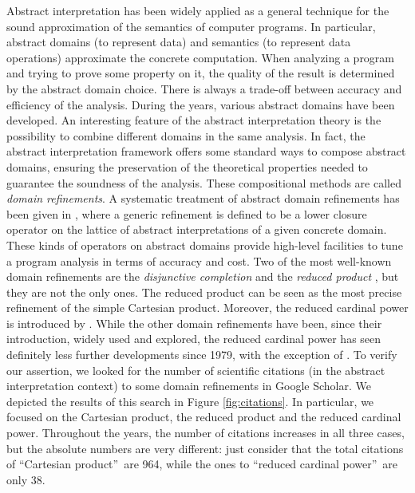 \documentclass[submission,copyright,creativecommons]{eptcs}
\begin{document}
Abstract interpretation \cite{CC79} has been widely applied as a general technique for the sound approximation of the semantics of computer programs. In particular, abstract domains (to represent data) and semantics (to represent data operations) approximate the concrete computation. When analyzing a program and trying to prove some property on it, the quality of the result is determined by the abstract domain choice. There is always a trade-off between accuracy and efficiency of the analysis. During the years, various abstract domains have been developed. An interesting feature of the abstract interpretation theory is the possibility to combine different domains in the same analysis. In fact, the abstract interpretation framework offers some standard ways to compose abstract domains, ensuring the preservation of the theoretical properties needed to guarantee the soundness of the analysis. These compositional methods are called \emph{domain refinements}. A systematic treatment of abstract domain refinements has been given in \cite{FGR96, GR97}, where a generic refinement is defined to be a lower closure operator on the lattice of abstract interpretations of a given concrete domain. These kinds of operators on abstract domains provide high-level facilities to tune a program analysis in terms of accuracy and cost. Two of the most well-known domain refinements are the \emph{disjunctive completion} \cite{CC79, CC94, FR99, GR98, J97} and the \emph{reduced product} \cite{CC79}, but they are not the only ones. The reduced product can be seen as the most precise refinement of the simple Cartesian product. Moreover, the reduced cardinal power is introduced by \cite{CC79}. While the other domain refinements have been, since their introduction, widely used and explored, the reduced cardinal power has seen definitely less further developments since 1979, with the exception of \cite{GR99}. To verify our assertion, we looked for the number of scientific citations (in the abstract interpretation context) to some domain refinements in Google Scholar. We depicted the results of this search in Figure \ref{fig:citations}. In particular, we focused on the Cartesian product, the reduced product and the reduced cardinal power. Throughout the years, the number of citations increases in all three cases, but the absolute numbers are very different: just consider that the total citations of \textquotedblleft Cartesian product\textquotedblright\ are 964, while the ones to \textquotedblleft reduced cardinal power\textquotedblright\ are only 38. 
\end{document}
